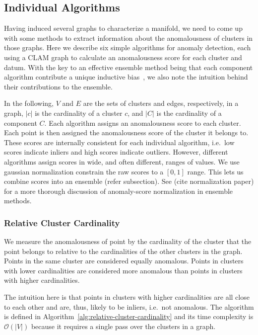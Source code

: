 \subsection{Individual Algorithms}
\label{subsec:methods:individual-algorithms}

Having induced several graphs to characterize a manifold, we need to come up with some methods to extract information about the anomalousness of clusters in those graphs.
Here we describe six simple algorithms for anomaly detection, each using a CLAM graph to calculate an anomalousness score for each cluster and datum.
With the key to an effective ensemble method being that each component algorithm contribute a unique inductive bias~\cite{chen2017outlier}, we also note the intuition behind their contributions to the ensemble.

In the following,
$V$ and $E$ are the sets of clusters and edges, respectively, in a graph,
$|c|$ is the cardinality of a cluster $c$,
and $|C|$ is the cardinality of a component $C$.
Each algorithm assigns an anomalousness score to each cluster.
Each point is then assigned the anomalousness score of the cluster it belongs to.
These scores are internally consistent for each individual algorithm, i.e.\ low scores indicate inliers and high scores indicate outliers.
However, different algorithms assign scores in wide, and often different, ranges of values.
We use gaussian normalization constrain the raw scores to a $[0, 1]$ range.
This lets us combine scores into an ensemble (refer subsection).
See (cite normalization paper) for a more thorough discussion of anomaly-score normalization in ensemble methods.

\subsubsection{Relative Cluster Cardinality}
\label{subsubsec:methods:individual-algorithms:relative-cluster-cardinality}
We measure the anomalousness of point by the cardinality of the cluster that the point belongs to relative to the cardinalities of the other clusters in the graph.
Points in the same cluster are considered equally anomalous.
Points in clusters with lower cardinalities are considered more anomalous than points in clusters with higher cardinalities.

The intuition here is that points in clusters with higher cardinalities are all close to each other and are, thus, likely to be inliers, i.e.\ not anomalous.
The algorithm is defined in Algorithm~\ref{alg:relative-cluster-cardinality} and its time complexity is $\mathcal{O}(|V|)$ because it requires a single pass over the clusters in a graph.

